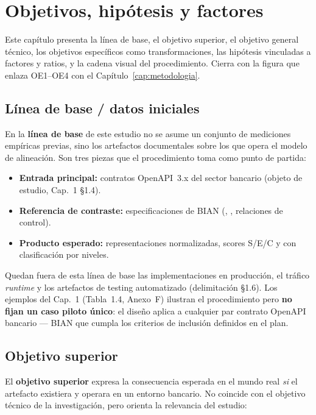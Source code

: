 \chapter{Objetivos, hipótesis y factores}
\label{cap:objetivos}

Este capítulo presenta la línea de base, el objetivo superior, el objetivo general técnico, los
objetivos específicos como transformaciones, las hipótesis vinculadas a factores y ratios, y la
cadena visual del procedimiento. Cierra con la figura que enlaza OE1--OE4 con el Capítulo~\ref{cap:metodologia}.

\section{Línea de base / datos iniciales}

En la \textbf{línea de base} de este estudio no se asume un conjunto de mediciones empíricas previas,
sino los artefactos documentales sobre los que opera el modelo de alineación. Son tres piezas que el
procedimiento toma como punto de partida:

\begin{itemize}
  \item \textbf{Entrada principal:} contratos OpenAPI~3.x del sector bancario (objeto de estudio,
        Cap.~1 §1.4).
  \item \textbf{Referencia de contraste:} especificaciones de \ServiceDomain{} BIAN (\Behavior{},
        \BusinessObject{}, relaciones de control).
  \item \textbf{Producto esperado:} representaciones normalizadas, scores S/E/C y
        \AlignmentScore{} con clasificación por niveles.
\end{itemize}

Quedan fuera de esta línea de base las implementaciones en producción, el tráfico \textit{runtime} y
los artefactos de testing automatizado (delimitación §1.6). Los ejemplos del Cap.~1 (Tabla~1.4,
Anexo~F) ilustran el procedimiento pero \textbf{no fijan un caso piloto único}: el diseño aplica a
cualquier par contrato OpenAPI bancario --- \ServiceDomain{} BIAN que cumpla los criterios de
inclusión definidos en el plan.

\section{Objetivo superior}

El \textbf{objetivo superior} expresa la consecuencia esperada en el mundo real \textit{si} el
artefacto existiera y operara en un entorno bancario. No coincide con el objetivo técnico de la
investigación, pero orienta la relevancia del estudio:

